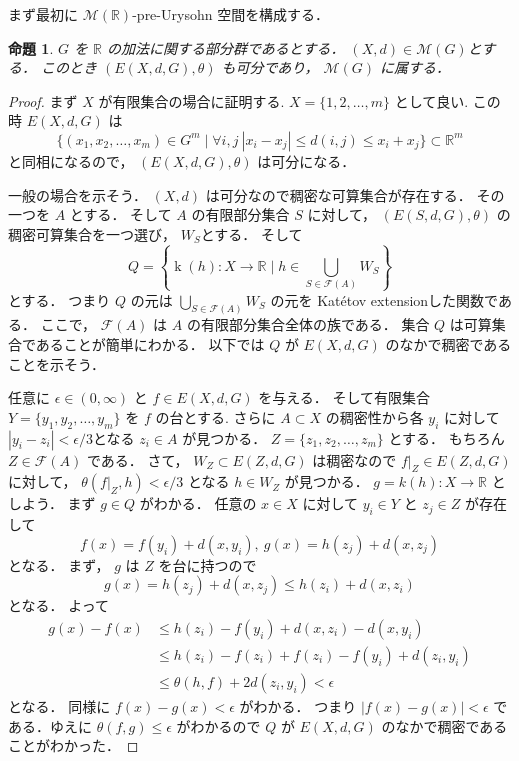 \documentclass[leqno, 12pt]{jsarticle}
\newtheorem{prop}[thm]{命題}
\newcommand{\rr}{\mathbb{R}}
\DeclareMathOperator{\kat}{k}
\begin{document}
まず最初に
$\mathscr{M}(\rr)$-pre-Urysohn
空間を構成する．
\begin{prop}\label{prop:func:separable}
$G$
を
$\rr$
の加法に関する部分群であるとする．
$(X, d)\in \mathscr{M}(G)$とする．
このとき
$(E(X, d, G), \theta)$
も可分であり，
$\mathscr{M}(G)$
に属する．
\end{prop}
\begin{proof}
まず
$X$
が有限集合の場合に証明する.
$X=\{1,2,\dots, m\}$
として良い.
この時
$E(X, d, G)$
は
\[
\{(x_{1},x_{2},\dots, x_{m})\in G^{m}\mid\forall i, j\  
|x_{i}-x_{j}|\le d(i, j)\le x_{i}+x_{j}\}\subset \rr^{m}
\]
と同相になるので，
$(E(X, d, G), \theta)$
は可分になる．
\par
一般の場合を示そう．
$(X, d)$
は可分なので稠密な可算集合が存在する．
その一つを
$A$
とする．
そして
$A$
の有限部分集合
$S$
に対して，
$(E(S, d, G), \theta)$
の稠密可算集合を一つ選び，
$W_{S}$とする．
そして
\[
Q=\left\{\kat(h)\colon X\to \rr\mid h\in \bigcup_{S\in \mathcal{F}(A)}W_{S}\right\}
\]
とする．
つまり
$Q$
の元は
$\bigcup_{S\in \mathcal{F}(A)}W_{S}$
の元を
Kat\'etov extensionした関数である．
ここで，
$\mathcal{F}(A)$
は
$A$
の有限部分集合全体の族である．
集合
$Q$
は可算集合であることが簡単にわかる．
以下では
$Q$
が
$E(X, d, G)$
のなかで稠密であることを示そう．



任意に
$\epsilon \in (0, \infty)$
と
$f\in E(X, d, G)$
を与える．
そして有限集合
$Y=\{y_1,y_2,\dots, y_m\}$
を
$f$
の台とする.
さらに
$A\subset X$
の稠密性から各
$y_{i}$
に対して
$|y_{i}-z_{i}|<\epsilon/3$となる
$z_{i}\in A$
が見つかる．
$Z=\{z_{1}, z_{2},\dots, z_{m}\}$
とする．
もちろん
$Z\in \mathcal{F}(A)$
である．
さて，
$W_Z\subset E(Z, d, G)$
は稠密なので
$f|_{Z}\in E(Z, d, G)$
に対して，
$\theta(f|_{Z}, h)<\epsilon/3$
となる
$h\in W_{Z}$
が見つかる．
$g=k(h)\colon X\to \rr$
としよう．
まず
$g\in Q$
がわかる．
任意の
$x\in X$
に対して
$y_{i}\in Y$
と
$z_{j}\in Z$
が存在して
\[
f(x)=f(y_{i})+d(x, y_{i}),\ g(x)=h(z_{j})+d(x,z_{j})
\]
となる．
まず，
$g$
は
$Z$
を台に持つので
\[
g(x)=h(z_{j})+d(x, z_{j})\le h(z_{i})+d(x, z_{i})
\]
となる．
よって
\begin{align*}
g(x)-f(x)
&\le
 h(z_{i})-f(y_{i})+d(x, z_{i})-d(x, y_{i})\\
&\le 
h(z_{i})-f(z_{i})+f(z_{i})-f(y_{i})+d(z_{i}, y_{i})\\
&\le 
\theta(h, f)+2d(z_{i}, y_{i}) <\epsilon
\end{align*}
となる．
同様に
$f(x)-g(x)<\epsilon$
がわかる．
つまり
$|f(x)-g(x)|<\epsilon$
である．ゆえに
$\theta(f, g)\le \epsilon$
がわかるので
$Q$
が
$E(X, d, G)$
のなかで稠密であることがわかった．
\end{proof}
\end{document}
